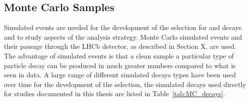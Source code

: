 \subsection{Monte Carlo Samples}
\label{sec:MCsamples}
Simulated events are needed for the development of the selection for \bsmumu and \bhh decays and to study aspects of the analysis strategy. Monte Carlo simulated events and their passage through the LHCb detector, as described in Section X, are used. The advantage of simulated events is that a clean sample a particular type of particle decay can be produced in much greater numbers compared to what is seen in data. A large range of different simulated decays types have been used over time for the development of the selection, the simulated decays used directly for studies documented in this thesis are listed in Table~\ref{tab:MC_decays}.

